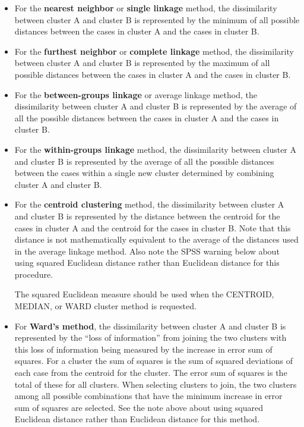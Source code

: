 \documentclass[a4paper,12pt]{article}
\begin{document}
\begin{itemize}
	\item For the \textbf{nearest neighbor} or \textbf{single linkage} method, the dissimilarity between cluster A and cluster B is represented by the minimum of all possible distances between the cases in cluster A and the cases in cluster B.
	
	\item For the \textbf{furthest neighbor} or \textbf{complete linkage} method, the dissimilarity between cluster A and cluster B is represented by the maximum of all possible distances between the cases in cluster A and the cases in cluster B.
	
	\item For the \textbf{between-groups linkage} or average linkage method, the dissimilarity between cluster A and cluster B is represented by the average of all the possible distances between the cases in cluster A and the cases in cluster B.
	
	\item For the \textbf{within-groups linkage} method, the dissimilarity between cluster A and cluster B is represented by the average of all the possible distances between the cases within a single new cluster determined by combining cluster A and cluster B.
	
	\item  
	For the \textbf{centroid clustering} method, the dissimilarity between cluster A and cluster B is represented by the distance between the centroid for the cases in cluster A and the centroid for the cases in cluster B.  Note that this distance is not mathematically equivalent to the average of the distances used in the average linkage method.  Also note the SPSS warning below about using squared Euclidean distance rather than Euclidean distance for this procedure.
	
	\begin{framed}
		The squared Euclidean measure should be used when the CENTROID, MEDIAN, or WARD cluster method is requested.
	\end{framed}
	
	\item For \textbf{Ward’s method}, the dissimilarity between cluster A and cluster B is represented by the “loss of information” from joining the two clusters with this loss of information being measured by the increase in error sum of squares.  For a cluster the sum of squares is the sum of squared deviations of each case from the centroid for the cluster.  The error sum of squares is the total of these for all clusters.  When selecting clusters to join, the two clusters among all possible combinations that have the minimum increase in error sum of squares are selected.  See the note above about using squared Euclidean distance rather than Euclidean distance for this method.
	

\end{itemize}
\end{document}
